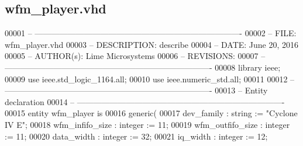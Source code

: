 \subsection{wfm\+\_\+player.\+vhd}
\label{wfm__player_8vhd_source}

\begin{DoxyCode}
00001 \textcolor{keyword}{-- ---------------------------------------------------------------------------- }
00002 \textcolor{keyword}{-- FILE:    wfm\_player.vhd}
00003 \textcolor{keyword}{-- DESCRIPTION: describe}
00004 \textcolor{keyword}{-- DATE:    June 20, 2016}
00005 \textcolor{keyword}{-- AUTHOR(s):   Lime Microsystems}
00006 \textcolor{keyword}{-- REVISIONS:}
00007 \textcolor{keyword}{-- ---------------------------------------------------------------------------- }
00008 \textcolor{vhdlkeyword}{library }\textcolor{keywordflow}{ieee};
00009 \textcolor{vhdlkeyword}{use }ieee.std\_logic\_1164.\textcolor{keywordflow}{all};
00010 \textcolor{vhdlkeyword}{use }ieee.numeric\_std.\textcolor{keywordflow}{all};
00011 
00012 \textcolor{keyword}{-- ----------------------------------------------------------------------------}
00013 \textcolor{keyword}{-- Entity declaration}
00014 \textcolor{keyword}{-- ----------------------------------------------------------------------------}
00015 \textcolor{keywordflow}{entity }wfm_player \textcolor{keywordflow}{is}
00016     \textcolor{keywordflow}{generic}\textcolor{vhdlchar}{(}
00017         \textcolor{vhdlchar}{dev_family}              \textcolor{vhdlchar}{:} \textcolor{comment}{string}  \textcolor{vhdlchar}{:=} \textcolor{keyword}{"Cyclone IV E"}; 
00018         \textcolor{vhdlchar}{wfm_infifo_size}     \textcolor{vhdlchar}{:} \textcolor{comment}{integer} \textcolor{vhdlchar}{:=} \textcolor{vhdllogic}{}\textcolor{vhdllogic}{11};
00019         \textcolor{vhdlchar}{wfm_outfifo_size}        \textcolor{vhdlchar}{:} \textcolor{comment}{integer} \textcolor{vhdlchar}{:=} \textcolor{vhdllogic}{}\textcolor{vhdllogic}{11};
00020         \textcolor{vhdlchar}{data_width}              \textcolor{vhdlchar}{:} \textcolor{comment}{integer} \textcolor{vhdlchar}{:=} \textcolor{vhdllogic}{}\textcolor{vhdllogic}{32};
00021         \textcolor{vhdlchar}{iq_width}                    \textcolor{vhdlchar}{:} \textcolor{comment}{integer} \textcolor{vhdlchar}{:=} \textcolor{vhdllogic}{}\textcolor{vhdllogic}{12};

\end{DoxyCode}
